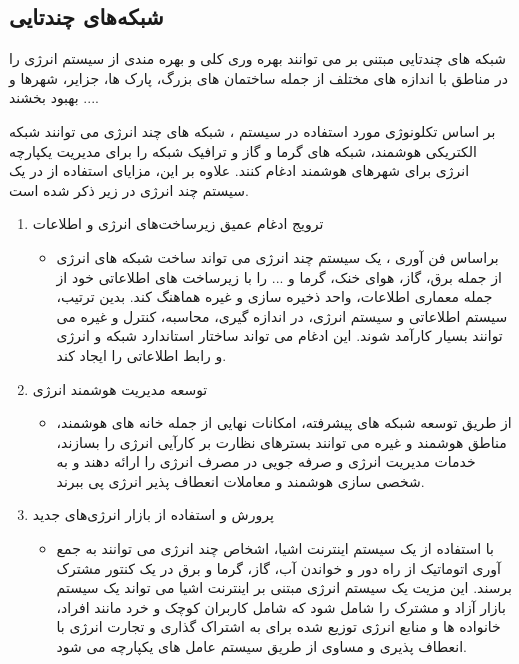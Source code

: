 \subsection{شبکه‌های چندتایی}
شبکه های چندتایی مبتنی بر  می توانند بهره وری کلی و بهره مندی از سیستم انرژی را در مناطق با اندازه های مختلف از جمله ساختمان های بزرگ، پارک ها، جزایر، شهرها و ... بهبود بخشند.

بر اساس تکلونوژی مورد استفاده در سیستم ، شبکه های چند انرژی می توانند شبکه الکتریکی هوشمند، شبکه های گرما و گاز و ترافیک شبکه را برای مدیریت یکپارچه انرژی برای شهرهای هوشمند ادغام کنند. علاوه بر این، مزایای استفاده از  در یک سیستم چند انرژی در زیر ذکر شده است.


\begin{enumerate}
    \item ترویج ادغام عمیق زیرساخت‌های انرژی و اطلاعات
    
    \begin{itemize}
        \item براساس فن آوری ، یک سیستم چند انرژی می تواند ساخت شبکه های انرژی از جمله برق، گاز، هوای خنک، گرما و ... را با زیرساخت های اطلاعاتی خود از جمله معماری اطلاعات، واحد ذخیره سازی و غیره هماهنگ کند. بدین ترتیب، سیستم اطلاعاتی و سیستم انرژی، در اندازه گیری، محاسبه، کنترل و غیره می توانند بسیار کارآمد شوند. این ادغام می تواند ساختار استاندارد شبکه و انرژی و رابط اطلاعاتی را ایجاد کند.
    \end{itemize}
    
    \item توسعه مدیریت هوشمند انرژی
    \begin{itemize}
        \item از طریق توسعه شبکه های  پیشرفته، امکانات نهایی از جمله خانه های هوشمند، مناطق هوشمند و غیره می توانند بسترهای نظارت بر کارآیی انرژی را بسازند، خدمات مدیریت انرژی و صرفه جویی در مصرف انرژی را ارائه دهند و به شخصی سازی هوشمند و معاملات انعطاف پذیر انرژی پی ببرند.
        
    \end{itemize}
    \item پرورش و استفاده از بازار انرژی‌های جدید
    \begin{itemize}
        \item با استفاده از یک سیستم اینترنت اشیا، اشخاص چند انرژی می توانند به جمع آوری اتوماتیک از راه دور و خواندن آب، گاز، گرما و برق در یک کنتور مشترک برسند. این مزیت یک سیستم انرژی مبتنی بر اینترنت اشیا می تواند یک سیستم بازار آزاد و مشترک را شامل شود که شامل کاربران کوچک و خرد مانند افراد، خانواده ها و منابع انرژی توزیع شده برای به اشتراک گذاری و تجارت انرژی با انعطاف پذیری و مساوی از طریق سیستم عامل های یکپارچه می شود.
    \end{itemize}
    
\end{enumerate}

